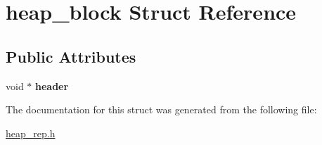 \hypertarget{structheap__block}{}\section{heap\+\_\+block Struct Reference}
\label{structheap__block}
\subsection*{Public Attributes}
\begin{DoxyCompactItemize}
\item 
\hypertarget{structheap__block_aae1eff562eae4f6394300fddb6041f24}{}void $\ast$ {\bfseries header}\label{structheap__block_aae1eff562eae4f6394300fddb6041f24}

\end{DoxyCompactItemize}


The documentation for this struct was generated from the following file\+:\begin{DoxyCompactItemize}
\item 
\hyperlink{heap__rep_8h}{heap\+\_\+rep.\+h}\end{DoxyCompactItemize}
